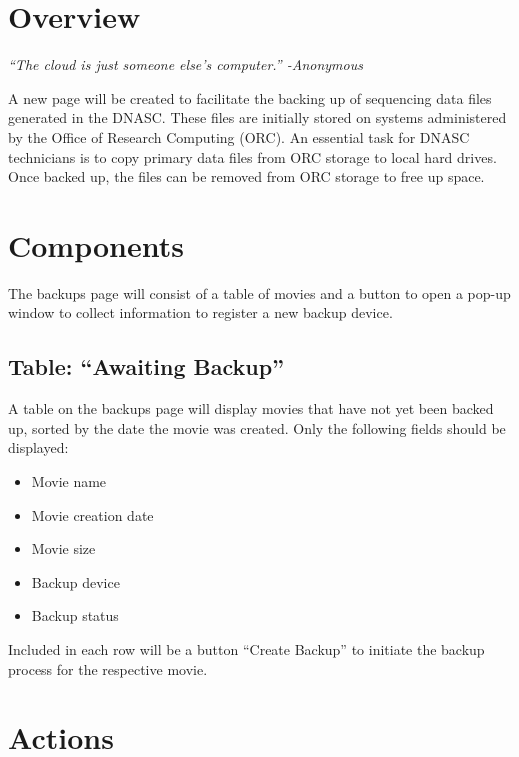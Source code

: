
\section{Overview}

\vspace{3mm}
\emph{``The cloud is just someone else's computer.'' -Anonymous}
\vspace{3mm}

A new page will be created to facilitate the backing up of sequencing data 
files generated in the DNASC. These files are initially stored on systems 
administered by the Office of Research Computing (ORC). An essential task 
for DNASC technicians is to copy primary data files from ORC storage to local 
hard drives. Once backed up, the files can be removed from ORC storage to 
free up space.

\section{Components}

The backups page will consist of a table of movies and a button to open a
pop-up window to collect information to register a new backup device. 

\subsection{Table: ``Awaiting Backup''}

A table on the backups page will display movies that have not yet been backed
up, sorted by the date the movie was created. Only the following fields should 
be displayed:

\begin{itemize}\itemsep1pt
    \item Movie name
    \item Movie creation date
    \item Movie size
    \item Backup device
    \item Backup status
\end{itemize}

\noindent Included in each row will be a button ``Create Backup'' to initiate 
the backup process for the respective movie.

\section{Actions}

